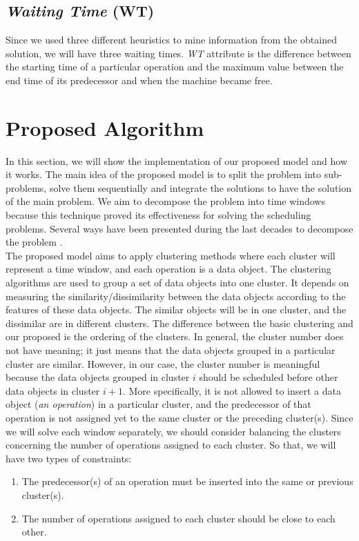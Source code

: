 \documentclass{article}
\begin{document}
\subsection{\textit{Waiting Time} (WT)}
Since we used three different heuristics to mine information from the obtained solution, we will have three waiting times. \textit{WT} attribute is the difference between the starting time of a particular operation and the maximum value between the end time of its predecessor and when the machine became free.

\section{Proposed Algorithm}
In this section, we will show the implementation of our proposed model and how it works. The main idea of the proposed model is to split the problem into sub-problems, solve them sequentially and integrate the solutions to have the solution of the main problem. We aim to decompose the problem into time windows because this technique proved its effectiveness for solving the scheduling problems. Several ways have been presented during the last decades to decompose the problem  \cite{zhai2014decomposition,singer2001decomposition,ovacik2012decomposition,uzsoy2000performance}.\\ 

The proposed model aims to apply clustering methods where each cluster will represent a time window, and each operation is a data object. The clustering algorithms are used to group a set of data objects into one cluster. It depends on measuring the similarity/dissimilarity between the data objects according to the features of these data objects. The similar objects will be in one cluster, and the dissimilar are in different clusters. The difference between the basic clustering and our proposed is the ordering of the clusters. In general, the cluster number does not have meaning; it just means that the data objects grouped in a particular cluster are similar. However, in our case, the cluster number is meaningful because the data objects grouped in cluster $i$ should be scheduled before other data objects in cluster $i+1$. More specifically, it is not allowed to insert a data object (\textit{an operation}) in a particular cluster, and the predecessor of that operation is not assigned yet to the same cluster or the preceding cluster(s). Since we will solve each window separately, we should consider balancing the clusters concerning the number of operations assigned to each cluster. So that, we will have two types of constraints:
\begin{enumerate}
\item The predecessor(s) of an operation must be inserted into the same or previous cluster(s).
\item The number of operations assigned to each cluster should be close to each other.
\end{enumerate}
\end{document}
